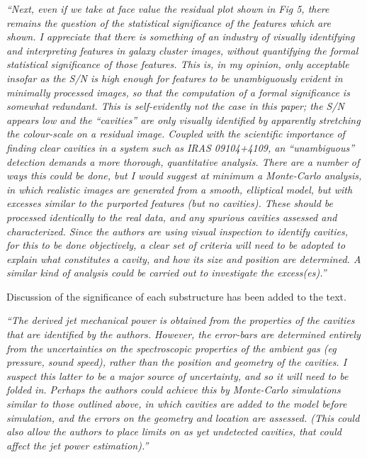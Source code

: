 \documentclass[11pt]{article}
\begin{document}
{\it{``Next, even if we take at face value the residual plot shown in
    Fig 5, there remains the question of the statistical significance
    of the features which are shown. I appreciate that there is
    something of an industry of visually identifying and interpreting
    features in galaxy cluster images, without quantifying the formal
    statistical significance of those features.  This is, in my
    opinion, only acceptable insofar as the S/N is high enough for
    features to be unambiguously evident in minimally processed
    images, so that the computation of a formal significance is
    somewhat redundant. This is self-evidently not the case in this
    paper; the S/N appears low and the ``cavities'' are only visually
    identified by apparently stretching the colour-scale on a residual
    image. Coupled with the scientific importance of finding clear
    cavities in a system such as IRAS 09104+4109, an ``unambiguous''
    detection demands a more thorough, quantitative analysis.  There
    are a number of ways this could be done, but I would suggest at
    minimum a Monte-Carlo analysis, in which realistic images are
    generated from a smooth, elliptical model, but with excesses
    similar to the purported features (but no cavities). These should
    be processed identically to the real data, and any spurious
    cavities assessed and characterized. Since the authors are using
    visual inspection to identify cavities, for this to be done
    objectively, a clear set of criteria will need to be adopted to
    explain what constitutes a cavity, and how its size and position
    are determined. A similar kind of analysis could be carried out to
    investigate the excess(es).''}}

Discussion of the significance of each substructure has been added to
the text.

\hrulefill

{\it{``The derived jet mechanical power is obtained from the
    properties of the cavities that are identified by the
    authors. However, the error-bars are determined entirely from the
    uncertainties on the spectroscopic properties of the ambient gas
    (eg pressure, sound speed), rather than the position and geometry
    of the cavities. I suspect this latter to be a major source of
    uncertainty, and so it will need to be folded in. Perhaps the
    authors could achieve this by Monte-Carlo simulations similar to
    those outlined above, in which cavities are added to the model
    before simulation, and the errors on the geometry and location are
    assessed. (This could also allow the authors to place limits on as
    yet undetected cavities, that could affect the jet power
    estimation).''}}
\end{document}
